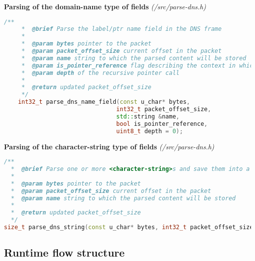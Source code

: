 \pagebreak

\vspace{1cm}
\textbf{Parsing of the domain-name type of fields} \textit{(/src/parse-dns.h)}
\begin{lstlisting}[language=C++]
    /**
     *  @brief Parse the label/ptr name field in the DNS frame
     * 
     *  @param bytes pointer to the packet
     *  @param packet_offset_size current offset in the packet
     *  @param name string to which the parsed content will be stored
     *  @param is_pointer_reference flag describing the context in which the name parsing is run
     *  @param depth of the recursive pointer call
     * 
     *  @return updated packet_offset_size
     */
    int32_t parse_dns_name_field(const u_char* bytes, 
                                int32_t packet_offset_size, 
                                std::string &name, 
                                bool is_pointer_reference,
                                uint8_t depth = 0);
\end{lstlisting}

\vspace{1cm}
\textbf{Parsing of the character-string type of fields} \textit{(/src/parse-dns.h)}
\begin{lstlisting}[language=C++]
/**
  *  @brief Parse one or more <character-string>s and save them into a string
  *
  *  @param bytes pointer to the packet
  *  @param packet_offset_size current offset in the packet
  *  @param name string to which the parsed content will be stored
  * 
  *  @return updated packet_offset_size
  */
size_t parse_dns_string(const u_char* bytes, int32_t packet_offset_size, std::string &name);
\end{lstlisting}

\pagebreak

\subsection{Runtime flow structure}

